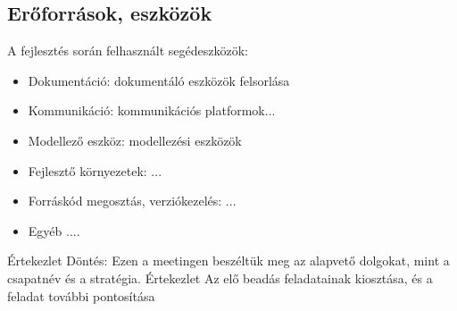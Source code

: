 \documentclass[../../projlab]{subfiles}
\begin{document}
\subsection{Erőforrások, eszközök}
A fejlesztés során felhasznált segédeszközök:
\begin{itemize}
	\item Dokumentáció: dokumentáló eszközök felsorlása
	\item Kommunikáció: kommunikációs platformok...
	\item Modellező eszköz: modellezési eszközök
	\item Fejlesztő környezetek: ...
	\item Forráskód megosztás, verziókezelés: ...
	\item Egyéb ....
\end{itemize}


\clearpage

\begin{naplo}
	{ Értekezlet
		\newline Döntés: Ezen a meetingen beszéltük meg az alapvető dolgokat, mint a csapatnév és a stratégia.
	}
	{ Értekezlet
		\newline Az elő beadás feladatainak kiosztása, és a feladat további pontosítása
	}
\end{naplo}
\end{document}
